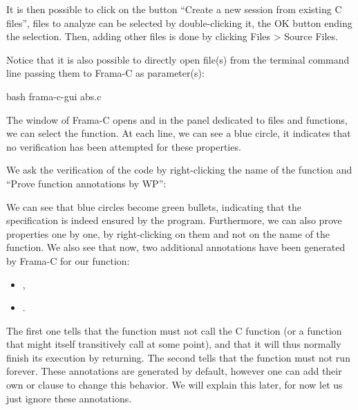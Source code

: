 It is then possible to click on the button ``Create a new session from
existing C files'', files to analyze can be selected by double-clicking
it, the OK button ending the selection. Then, adding other files is
done by clicking Files > Source Files.



Notice that it is also possible to directly open file(s) from the
terminal command line passing them to Frama-C as parameter(s):



\begin{CodeBlock}{bash}
frama-c-gui abs.c
\end{CodeBlock}





The window of Frama-C opens and in the panel dedicated to files and
functions, we can select the  function. At each
 line, we can see a blue circle, it indicates that no
verification has been attempted for these properties.



We ask the verification of the code by right-clicking the name of the
function and ``Prove function annotations by WP'':





We can see that blue circles become green bullets, indicating that the
specification is indeed ensured by the program. Furthermore, we can also prove
properties one by one, by right-clicking on them and not on the name of
the function. We also see that now, two additional annotations have been
generated by Frama-C for our function:
\begin{itemize}
  \item {},
  \item {}.
\end{itemize}
The first one tells that the function must not call the C 
function (or a function that might itself transitively call 
at some point), and that it will thus normally finish its execution by
returning. The second tells that the function must not run forever. These
annotations are generated by default, however one can add  their own
 or  clause to change this behavior.
We will explain this later, for now let us just ignore these annotations.



